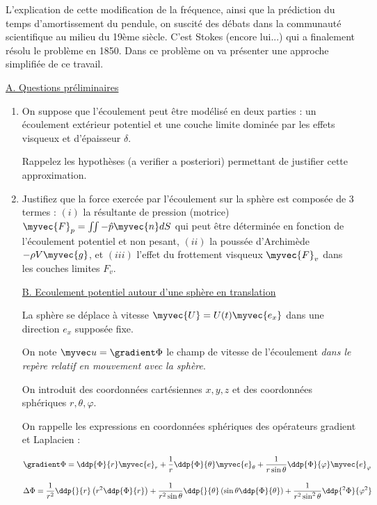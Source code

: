 L'explication de cette modification de la fréquence, ainsi que la prédiction du temps d'amortissement du pendule, on suscité des débats dans la communauté scientifique au milieu du 19ème siècle. C'est Stokes (encore lui...) qui a finalement résolu le problème en 1850. Dans ce problème on va présenter une approche simplifiée de ce travail.

\underline{A. Questions préliminaires}

\begin{enumerate}
\item
On suppose que l'écoulement peut être modélisé en deux parties : un écoulement extérieur potentiel et une couche limite dominée par les effets visqueux et d'épaisseur $\delta$. 

Rappelez les hypothèses (a verifier a posteriori) permettant de justifier cette approximation.


\item Justifiez que la force exercée par l'écoulement sur la sphère est composée de 3 termes : 
$(i)$ la résultante de pression (motrice) 
$\myvec{F}_p = \iint - \hat{p} \myvec{n} dS$ qui peut être déterminée en fonction de l'écoulement potentiel et non pesant, $(ii)$ la poussée d'Archimède $-\rho V \myvec{g}$, et $(iii)$ l'effet du frottement visqueux $\myvec{F}_v$ dans les couches limites $F_v$.


\underline{B. Ecoulement potentiel autour d'une sphère en translation}

La sphère se déplace à vitesse $\myvec{U} =U(t) \myvec{e_x}$ dans une direction $e_x$ supposée fixe.


On note $\myvec u = \gradient \Phi$ le champ de vitesse de l'écoulement {\em dans le repère relatif en mouvement avec la sphère}.

On introduit des coordonnées cartésiennes $x,y,z$ et des coordonnées sphériques 
$r,\theta,\varphi$.



On rappelle les expressions en coordonnées sphériques des opérateurs gradient et Laplacien :

$$
\gradient \Phi = \ddp{\Phi}{r} \myvec{e}_r 
+ \frac{1}{r}\ddp{\Phi}{\theta} \myvec{e}_\theta 
+ \frac{1}{r \sin \theta}\ddp{\Phi}{\varphi} \myvec{e}_\varphi
$$

$$
\Delta \Phi = \frac{1}{r^2} \ddp{}{r} \left( r^2 \ddp{\Phi}{r} \right) 
+ \frac{1}{r^2\sin \theta} \ddp{}{\theta} \left( \sin \theta \ddp{\Phi}{\theta} \right)
+ \frac{1}{r^2\sin^2 \theta} \ddp{^2\Phi}{\varphi^2} 
$$



\end{enumerate}
